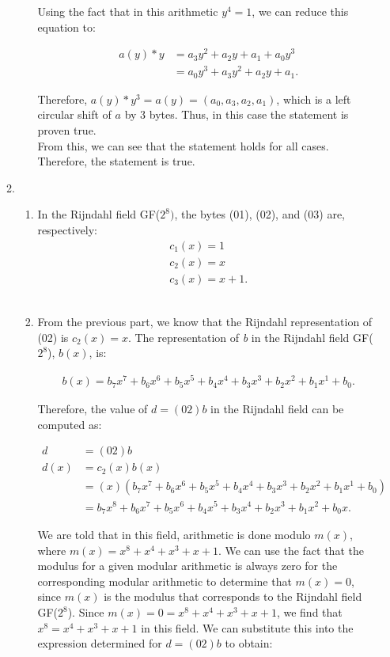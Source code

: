 \documentclass[11pt]{article}
\theoremstyle{definition}
\begin{document}
\begin{enumerate}
\begin{enumerate}
\begin{enumerate}
Using the fact that in this arithmetic $y^4 = 1$, we can reduce this equation to:

\begin{align*}
    a(y) * y &= a_3y^2 + a_2y + a_1 + a_0y^3 \\
    &= a_0y^3 + a_3y^2 + a_2y + a_1.
\end{align*}

Therefore, $a(y) * y^3 = a(y) = (a_0, a_3, a_2, a_1)$, which is a left  circular shift of $a$ by 3 bytes. Thus, in this case the statement is proven true.
\\

From this, we can see that the statement holds for all cases. Therefore, the statement is true. 

\end{enumerate}

\item \begin{enumerate}
\item In the Rijndahl field GF($2^8)$, the bytes (01), (02), and (03) are, respectively:
\begin{align*}
    c_1(x) = 1\\
    c_2(x) = x\\
    c_3(x) = x+1.
\end{align*} 
\\

\item From the previous part, we know that the Rijndahl representation of (02) is $c_2(x) = x$. The representation of \textit{b} in the Rijndahl field GF($2^8$), $b(x)$, is:

\begin{align*}
    b(x) = b_7x^7 + b_6x^6 + b_5x^5 + b_4x^4 + b_3x^3 + b_2x^2 + b_1x^1 + b_0.
\end{align*}

Therefore, the value of $d = (02)b$ in the Rijndahl field can be computed as:

\begin{align*}
    d &= (02)b \\
    d(x) &= c_2(x)b(x) \\
    &= (x)(b_7x^7 + b_6x^6 + b_5x^5 + b_4x^4 + b_3x^3 + b_2x^2 + b_1x^1 + b_0) \\
    &= b_7x^8 + b_6x^7 + b_5x^6 + b_4x^5 + b_3x^4 + b_2x^3 + b_1x^2 + b_0x.
\end{align*}

We are told that in this field, arithmetic is done modulo $m(x)$, where $m(x) = x^8 + x^4 + x^3 + x + 1$. We can use the fact that the modulus for a given modular arithmetic is always zero for the corresponding modular arithmetic to determine that $m(x) = 0$, since $m(x)$ is the modulus that corresponds to the Rijndahl field GF($2^8$). Since $m(x) = 0 = x^8 + x^4 + x^3 + x + 1$, we find that $x^8 = x^4 + x^3 + x + 1$ in this field. We can substitute this into the expression determined for $d = (02)b$ to obtain:


\end{enumerate}
\end{enumerate}
\end{enumerate}
\end{document}
